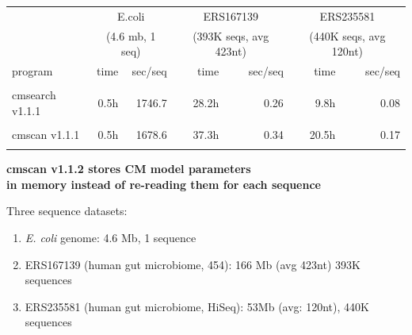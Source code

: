 \documentclass[landscape]{slides}
\begin{document}
\begin{slide}
\begin{slide}
\begin{center}
\begin{tabular}{l|r|r||r|r||r|r||}
         & \multicolumn{2}{c||}{E.coli}  & \multicolumn{2}{c||}{ERS167139} & \multicolumn{2}{c||}{ERS235581} \\
         & \multicolumn{2}{c||}{(4.6 mb, 1 seq)}  & \multicolumn{2}{c||}{(393K seqs, avg 423nt)} & \multicolumn{2}{c||}{(440K seqs, avg 120nt)} \\ \hline
program  & time & sec/seq & time & sec/seq & time & sec/seq \\ \hline
         &      &  & & & & \\
cmsearch v1.1.1  &     0.5h& 1746.7  & 28.2h   & 0.26    & 9.8h    & 0.08 \\
         &      &  & & & & \\
cmscan v1.1.1   &     0.5h& 1678.6  & 37.3h   & 0.34    & 20.5h   & 0.17 \\
         &      &  & & & & \\ 
\end{tabular}

\end{center}
\vfill
\end{slide}
\begin{slide}
\begin{center}
\textbf{cmscan v1.1.2 stores CM model parameters \\ in memory instead of re-reading them for each sequence}
\end{center}
\medskip

\small

Three sequence datasets:
\begin{enumerate}
  \item \emph{E. coli} genome: 4.6 Mb, 1 sequence
  \item ERS167139 (human gut microbiome, 454): 166 Mb (avg 423nt) 393K sequences 
  \item ERS235581 (human gut microbiome, HiSeq): 53Mb (avg: 120nt), 440K sequences
\end{enumerate}

\begin{center}

\medskip
\medskip


\end{center}
\end{slide}
\end{slide}
\end{document}

